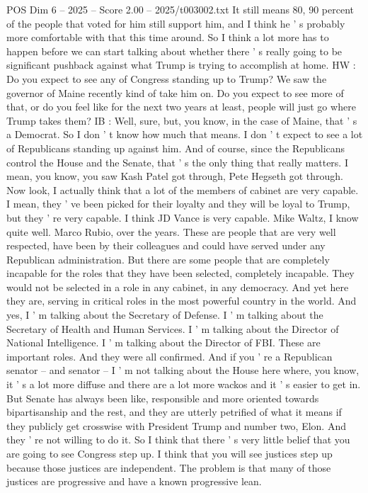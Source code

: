 \begin{textsample}{POS Dim 6 – 2025 – Score 2.00 – 2025/t003002.txt}
It still means 80, 90 percent of the people that voted for him still support him, and I think he ' s probably more comfortable with that this time around.
So I think a lot more has to happen before we can start talking about whether there ' s really going to be significant pushback against what Trump is trying to accomplish at home.
HW : Do you expect to see any of Congress standing up to Trump?
We saw the governor of Maine recently kind of take him on.
Do you expect to see more of that, or do you feel like for the next two years at least, people will just go where Trump takes them?
IB : Well, sure, but, you know, in the case of Maine, that ' s a Democrat.
So I don ' t know how much that means.
I don ' t expect to see a lot of Republicans standing up against him.
And of course, since the Republicans control the House and the Senate, that ' s the only thing that really matters.
I mean, you know, you saw Kash Patel got through, Pete Hegseth got through.
Now look, I actually think that a lot of the members of cabinet are very capable.
I mean, they ' ve been picked for their loyalty and they will be loyal to Trump, but they ' re very capable.
I think JD Vance is very capable.
Mike Waltz, I know quite well.
Marco Rubio, over the years.
These are people that are very well respected, have been by their colleagues and could have served under any Republican administration.
But there are some people that are completely incapable for the roles that they have been selected, completely incapable.
They would not be selected in a role in any cabinet, in any democracy.
And yet here they are, serving in critical roles in the most powerful country in the world.
And yes, I ' m talking about the Secretary of Defense.
I ' m talking about the Secretary of Health and Human Services.
I ' m talking about the Director of National Intelligence.
I ' m talking about the Director of FBI.
These are important roles.
And they were all confirmed.
And if you ' re a Republican senator -- and senator -- I ' m not talking about the House here where, you know, it ' s a lot more diffuse and there are a lot more wackos and it ' s easier to get in.
But Senate has always been like, responsible and more oriented towards bipartisanship and the rest, and they are utterly petrified of what it means if they publicly get crosswise with President Trump and number two, Elon.
And they ' re not willing to do it.
So I think that there ' s very little belief that you are going to see Congress step up.
I think that you will see justices step up because those justices are independent.
The problem is that many of those justices are progressive and have a known progressive lean.

\end{textsample}

